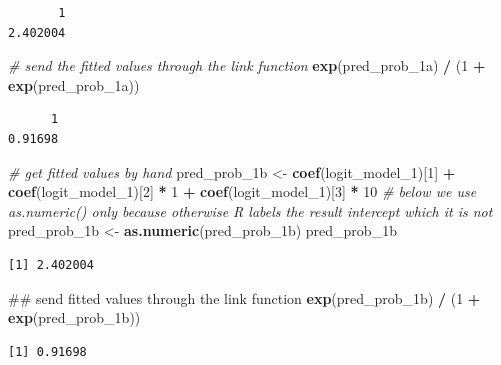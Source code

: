 \documentclass[]{article}
\newenvironment{Shaded}{\begin{snugshade}}{\end{snugshade}}
\newcommand{\KeywordTok}[1]{\textcolor[rgb]{0.13,0.29,0.53}{\textbf{#1}}}
\newcommand{\DecValTok}[1]{\textcolor[rgb]{0.00,0.00,0.81}{#1}}
\newcommand{\StringTok}[1]{\textcolor[rgb]{0.31,0.60,0.02}{#1}}
\newcommand{\CommentTok}[1]{\textcolor[rgb]{0.56,0.35,0.01}{\textit{#1}}}
\newcommand{\OperatorTok}[1]{\textcolor[rgb]{0.81,0.36,0.00}{\textbf{#1}}}
\newcommand{\NormalTok}[1]{#1}
\theoremstyle{definition}
\theoremstyle{definition}
\theoremstyle{definition}
\theoremstyle{remark}
\begin{document}
\begin{verbatim}
       1 
2.402004 
\end{verbatim}

\begin{Shaded}
\begin{Highlighting}[]
\CommentTok{# send the fitted values through the link function}
\KeywordTok{exp}\NormalTok{(pred_prob_1a) }\OperatorTok{/}\StringTok{ }\NormalTok{(}\DecValTok{1} \OperatorTok{+}\StringTok{ }\KeywordTok{exp}\NormalTok{(pred_prob_1a))}
\end{Highlighting}
\end{Shaded}

\begin{verbatim}
      1 
0.91698 
\end{verbatim}

\begin{Shaded}
\begin{Highlighting}[]
\CommentTok{# get fitted values by hand}
\NormalTok{pred_prob_1b <-}\StringTok{ }\KeywordTok{coef}\NormalTok{(logit_model_}\DecValTok{1}\NormalTok{)[}\DecValTok{1}\NormalTok{] }\OperatorTok{+}\StringTok{ }\KeywordTok{coef}\NormalTok{(logit_model_}\DecValTok{1}\NormalTok{)[}\DecValTok{2}\NormalTok{] }\OperatorTok{*}\StringTok{ }\DecValTok{1} \OperatorTok{+}\StringTok{ }\KeywordTok{coef}\NormalTok{(logit_model_}\DecValTok{1}\NormalTok{)[}\DecValTok{3}\NormalTok{] }\OperatorTok{*}\StringTok{ }\DecValTok{10}
\CommentTok{# below we use as.numeric() only because otherwise R labels the result intercept which it is not}
\NormalTok{pred_prob_1b <-}\StringTok{ }\KeywordTok{as.numeric}\NormalTok{(pred_prob_1b)}
\NormalTok{pred_prob_1b}
\end{Highlighting}
\end{Shaded}

\begin{verbatim}
[1] 2.402004
\end{verbatim}

\begin{Shaded}
\begin{Highlighting}[]
\NormalTok{## send fitted values through the link function}
\KeywordTok{exp}\NormalTok{(pred_prob_1b) }\OperatorTok{/}\StringTok{ }\NormalTok{(}\DecValTok{1} \OperatorTok{+}\StringTok{ }\KeywordTok{exp}\NormalTok{(pred_prob_1b))}
\end{Highlighting}
\end{Shaded}

\begin{verbatim}
[1] 0.91698
\end{verbatim}
\end{document}
